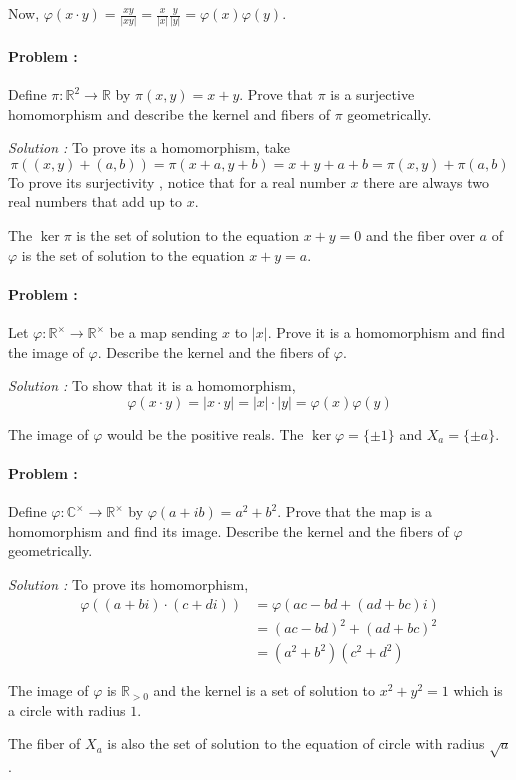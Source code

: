 Now, $\varphi(x \cdot y) = \frac{xy}{|xy|} =\frac{x}{|x|} \frac{y}{|y|} = \varphi(x) \varphi(y)$.

\paragraph{Problem :} Define $\pi : \mathbb{R}^{2} \to \mathbb{R}$ by $\pi(x,y) = x+y$. Prove that $\pi$ is a surjective homomorphism and
describe the kernel and fibers of $\pi$ geometrically.

\vspace{4mm}
\textit{Solution :} To prove its a homomorphism, take 
\[ \pi((x,y)+(a,b))=\pi(x+a,y+b)=x+y+a+b = \pi(x,y) + \pi(a,b) \]
To prove its surjectivity , notice that for a real number $x$ there are always two real numbers that add up to $x$.

The $\ker \pi$ is the set of solution to the equation $x+y=0$ and the fiber over $a$ of $\varphi$ is the set of solution to the equation
$x+y=a$.

\paragraph{Problem :} Let $\varphi : \mathbb{R}^{\times} \to \mathbb{R}^{\times}$ be a map sending $x$ to $|x|$. Prove it is a homomorphism and 
find the image of $\varphi$. Describe the kernel and the fibers of $\varphi$.

\vspace{4mm}
\textit{Solution :} To show that it is a homomorphism, 
\[ \varphi(x \cdot y) = |x \cdot y| = |x| \cdot |y| = \varphi(x) \varphi(y) \]

The image of $\varphi$ would be the positive reals. The $\ker \varphi = \{\pm 1\}$ and $X_a = \{\pm a\}$.

\paragraph{Problem :} Define $\varphi : \mathbb{C}^{\times} \to \mathbb{R}^{\times}$ by $\varphi(a+ib)=a^2 +b^2$. Prove that the map 
is a homomorphism and find its image. Describe the kernel and the fibers of $\varphi$ geometrically.

\vspace{4mm}
\textit{Solution :} To prove its homomorphism,
\begin{align*}
    \varphi((a+bi)\cdot (c+di)) &= \varphi(ac-bd+(ad+bc)i) \\
    &= (ac-bd)^2 + (ad+bc)^2 \\
    &= (a^2+b^2)(c^2+d^2)
\end{align*}

The image of $\varphi$ is $\mathbb{R}_{>0}$ and the kernel is a set of solution to $x^2+y^2=1$ which is a circle with radius $1$.

The fiber of $X_a$ is also the set of solution to the equation of circle with radius $\sqrt{a}$.